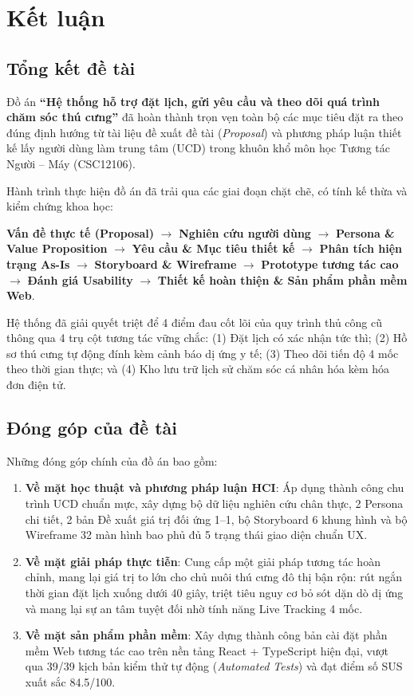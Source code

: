 \section{Kết luận}

\subsection{Tổng kết đề tài}
Đồ án \textbf{``Hệ thống hỗ trợ đặt lịch, gửi yêu cầu và theo dõi quá trình chăm sóc thú cưng''} đã hoàn thành trọn vẹn toàn bộ các mục tiêu đặt ra theo đúng định hướng từ tài liệu đề xuất đề tài (\textit{Proposal}) và phương pháp luận thiết kế lấy người dùng làm trung tâm (UCD) trong khuôn khổ môn học Tương tác Người -- Máy (CSC12106).

Hành trình thực hiện đồ án đã trải qua các giai đoạn chặt chẽ, có tính kế thừa và kiểm chứng khoa học:
\begin{center}
\textbf{Vấn đề thực tế (Proposal)} $\rightarrow$ \textbf{Nghiên cứu người dùng} $\rightarrow$ \textbf{Persona \& Value Proposition} $\rightarrow$ \textbf{Yêu cầu \& Mục tiêu thiết kế} $\rightarrow$ \textbf{Phân tích hiện trạng As-Is} $\rightarrow$ \textbf{Storyboard \& Wireframe} $\rightarrow$ \textbf{Prototype tương tác cao} $\rightarrow$ \textbf{Đánh giá Usability} $\rightarrow$ \textbf{Thiết kế hoàn thiện \& Sản phẩm phần mềm Web}.
\end{center}

Hệ thống đã giải quyết triệt để 4 điểm đau cốt lõi của quy trình thủ công cũ thông qua 4 trụ cột tương tác vững chắc: (1) Đặt lịch có xác nhận tức thì; (2) Hồ sơ thú cưng tự động đính kèm cảnh báo dị ứng y tế; (3) Theo dõi tiến độ 4 mốc theo thời gian thực; và (4) Kho lưu trữ lịch sử chăm sóc cá nhân hóa kèm hóa đơn điện tử.

\subsection{Đóng góp của đề tài}
Những đóng góp chính của đồ án bao gồm:
\begin{enumerate}
    \item \textbf{Về mặt học thuật và phương pháp luận HCI}: Áp dụng thành công chu trình UCD chuẩn mực, xây dựng bộ dữ liệu nghiên cứu chân thực, 2 Persona chi tiết, 2 bản Đề xuất giá trị đối ứng 1--1, bộ Storyboard 6 khung hình và bộ Wireframe 32 màn hình bao phủ đủ 5 trạng thái giao diện chuẩn UX.
    \item \textbf{Về mặt giải pháp thực tiễn}: Cung cấp một giải pháp tương tác hoàn chỉnh, mang lại giá trị to lớn cho chủ nuôi thú cưng đô thị bận rộn: rút ngắn thời gian đặt lịch xuống dưới 40 giây, triệt tiêu nguy cơ bỏ sót dặn dò dị ứng và mang lại sự an tâm tuyệt đối nhờ tính năng Live Tracking 4 mốc.
    \item \textbf{Về mặt sản phẩm phần mềm}: Xây dựng thành công bản cài đặt phần mềm Web tương tác cao trên nền tảng React + TypeScript hiện đại, vượt qua 39/39 kịch bản kiểm thử tự động (\textit{Automated Tests}) và đạt điểm số SUS xuất sắc 84.5/100.
\end{enumerate}

